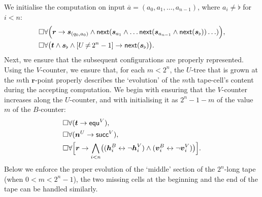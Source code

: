 \documentclass[10pt,a4paper]{amsart}
\theoremstyle{plain}
\theoremstyle{definition}
\newcommand{\fform}[1]{\boldsymbol{#1}}
\newcommand{\svar}{\fform{s}}
\newcommand{\hvar}{\fform{h}}
\newcommand{\vvar}{\fform{v}}
\newcommand{\blank}{\flat}
\newcommand{\cR}{B}
\newcommand{\cU}{U}
\newcommand{\cV}{V}
\newcommand{\cvf}[3]{[{#1}\mathop{#2}{#3}]}
\newcommand{\inpw}{\overline{a}}
\newcommand{\inpww}{a}
\newcommand{\nextU}{\fform{n}^\cU}
\newcommand{\nextV}{\scc^\cV}
\newcommand{\Bv}{\forall}
\newcommand{\Bh}{\Box}
\newcommand{\start}{\fform{r}}
\newcommand{\nextt}[1]{\mathsf{next}({#1})}
\newcommand{\grid}{\mathsf{equ}}
\newcommand{\scc}{\mathsf{succ}}
\newcommand{\tree}{\fform{t}}
\begin{document}
	We initialise the computation on input $\inpw=(\inpww_0,\inpww_1,\dots, \inpww_{n-1})$, where $\inpww_i\ne\blank$ for $i<n$:
	\begin{align}\label{cinit}
		& \Bh\Bv\Bigl(\start\to\svar_{(q_0,\inpww_0)} \land\nextt{\svar_{\inpww_1}\land\dots\nextt{\svar_{\inpww_{n-1}}\land\nextt{\svar_\blank}}\dots}\Bigr),\\
		& \Bh\Bv\bigl(\tree\land\svar_\blank\land\cvf{\cU}{\ne}{2^n-1}\to\nextt{\svar_\blank}\bigr).
	\end{align}
	Next, we ensure that the subsequent configurations are properly represented. 
	Using the $\cV$-counter,
	we ensure that, for each $m<2^n$, the $\cU$-tree 
	that is grown at the $m$th $\start$-point 
	properly describes the `evolution' of the $m$th tape-cell's content during the accepting computation. 
	We begin with ensuring that the $\cV$-counter increases along the $\cU$-counter, and with initialising it as $2^n-1-m$ of the value $m$ of the $\cR$-counter:
	\begin{align}
		& \Bh\Bv(\tree\to\grid^\cV),\\
		& \Bh\Bv(\nextU\to\nextV),\\
		\label{Vinit}
		& \Bh\Bv\Bigl[\start\to\bigwedge_{i<n}\bigl((\hvar_i^\cR\leftrightarrow \neg \hvar_i^\cV)\land(\vvar_i^\cR\leftrightarrow \neg \vvar_i^\cV)\bigr)\Bigr].
	\end{align}
	Below we enforce the proper evolution of the `middle' section of the $2^n$-long tape (when $0<m<2^n-1$), the two missing cells at the beginning and the end of the tape can be handled similarly. 
	
\end{document}
